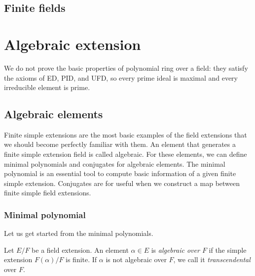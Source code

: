 \documentclass{../exp}
\begin{document}
\subsection{Finite fields}











\section{Algebraic extension}

We do not prove the basic properties of polynomial ring over a field: they satisfy the axioms of ED, PID, and UFD, so every prime ideal is maximal and every irreducible element is prime.

\subsection{Algebraic elements}
Finite simple extensions are the most basic examples of the field extensions that we should become perfectly familiar with them.
An element that generates a finite simple extension field is called algebraic.
For these elements, we can define minimal polynomials and conjugates for algebraic elements.
The minimal polynomial is an essential tool to compute basic information of a given finite simple extension.
Conjugates are for useful when we construct a map between finite simple field extensions.

\subsubsection{Minimal polynomial}
Let us get started from the minimal polynomials.

\begin{defn}
Let $E/F$ be a field extension.
An element $\alpha\in E$ is \emph{algebraic over $F$} if the simple extension $F(\alpha)/F$ is finite.
If $\alpha$ is not algebraic over $F$, we call it \emph{transcendental} over $F$.
\end{defn}
\end{document}
